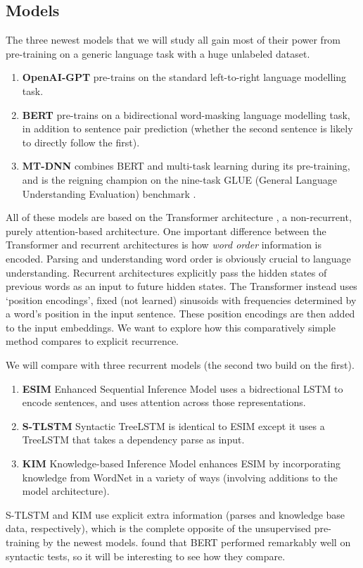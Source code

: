 \documentclass[letterpaper]{article}
\begin{document}
\subsection{Models}
The three newest models that we will study all gain most of their power from pre-training on a generic language task with a huge unlabeled dataset.
\begin{enumerate}
	\item \textbf{OpenAI-GPT} \cite{radford_improving_2018} pre-trains on the standard left-to-right language modelling task.
	\item \textbf{BERT} \cite{devlin_bert:_2018} pre-trains on a bidirectional word-masking language modelling task, in addition to sentence pair prediction (whether the second sentence is likely to directly follow the first).
	\item\textbf{MT-DNN} \cite{liu_multi-task_2019} combines BERT and multi-task learning during its pre-training, and is the reigning champion on the nine-task GLUE (General Language Understanding Evaluation) benchmark \cite{wang_glue:_2018}.
\end{enumerate}
All of these models are based on the Transformer architecture \cite{vaswani_attention_2017}, a non-recurrent, purely attention-based architecture.
One important difference between the Transformer and recurrent architectures is how \emph{word order} information is encoded.
Parsing and understanding word order is obviously crucial to language understanding.
Recurrent architectures explicitly pass the hidden states of previous words as an input to future hidden states.
The Transformer instead uses `position encodings', fixed (not learned) sinusoids with frequencies determined by a word's position in the input sentence.
These position encodings are then added to the input embeddings.
We want to explore how this comparatively simple method compares to explicit recurrence.

We will compare with three recurrent models (the second two build on the first).
\begin{enumerate}
	\item \textbf{ESIM} Enhanced Sequential Inference Model \cite{chen_enhanced_2016} uses a bidrectional LSTM to encode sentences, and uses attention across those representations.
	\item \textbf{S-TLSTM} Syntactic TreeLSTM \cite{chen_enhanced_2016} is identical to ESIM except it uses a TreeLSTM that takes a dependency parse as input.
	\item \textbf{KIM} Knowledge-based Inference Model \cite{chen_neural_2018} enhances ESIM by incorporating knowledge from WordNet in a variety of ways (involving additions to the model architecture).
\end{enumerate}
S-TLSTM and KIM use explicit extra information (parses and knowledge base data, respectively), which is the complete opposite of the unsupervised pre-training by the newest models.
\citeauthor{goldberg_assessing_2019} found that BERT performed remarkably well on syntactic tests, so it will be interesting to see how they compare.
\end{document}
